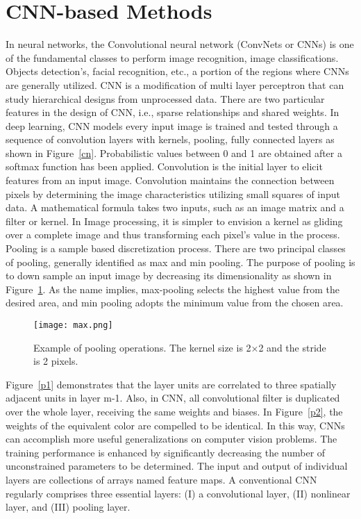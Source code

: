 \documentclass[doctor,english,listoffigures,listoftables]{thesis-uestc}
\begin{document}
\section{CNN-based Methods}
In neural networks, the Convolutional neural network (ConvNets or CNNs) is one of the fundamental classes to perform image recognition, image classifications. Objects detection's, facial recognition, etc., a portion of the regions where CNNs are generally utilized. CNN is a modification of multi layer perceptron that can study hierarchical designs from unprocessed data. There are two particular features in the design of CNN, i.e., sparse relationships and shared weights. In deep learning, CNN models every input image is trained and tested through a sequence of convolution layers with kernels, pooling, fully connected layers as shown in Figure~\ref{cn}. Probabilistic values between 0 and 1 are obtained after a softmax function has been applied. Convolution is the initial layer to elicit features from an input image. Convolution maintains the connection between pixels by determining the image characteristics utilizing small squares of input data. A mathematical formula takes two inputs, such as an image matrix and a filter or kernel. In Image processing, it is simpler to envision a kernel as gliding over a complete image and thus transforming each pixel's value in the process. Pooling is a sample based discretization process. There are two principal classes of pooling, generally identified as max and min pooling. The purpose of pooling is to down sample an input image by decreasing its dimensionality as shown in Figure~\ref{ma}. As the name implies, max-pooling selects the highest value from the desired area, and min pooling adopts the minimum value from the chosen area.
\begin{figure}[H]
\texttt{[image: max.png]}
\caption{Example of pooling operations. The kernel size is 2×2 and the stride is 2 pixels.}
\label{ma}
\end{figure} 
Figure~\ref{p1} demonstrates that the layer units are correlated to three spatially adjacent units in layer m-1. Also, in CNN, all convolutional filter is duplicated over the whole layer, receiving the same weights and biases. In Figure~\ref{p2}, the weights of the equivalent color are compelled to be identical. In this way, CNNs can accomplish more useful generalizations on computer vision problems. The training performance is enhanced by significantly decreasing the number of unconstrained parameters to be determined. The input and output of individual layers are collections of arrays named feature maps. A conventional CNN regularly comprises three essential layers: (I) a convolutional layer, (II) nonlinear layer, and (III) pooling layer.
\end{document}
